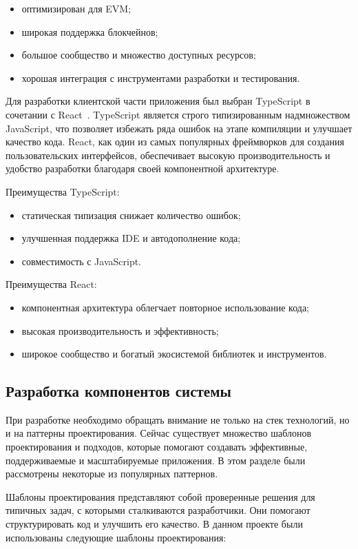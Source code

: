 \begin{itemize}
    \item оптимизирован для EVM;
    \item широкая поддержка блокчейнов;
    \item большое сообщество и множество доступных ресурсов;
    \item хорошая интеграция с инструментами разработки и тестирования.
\end{itemize}

Для разработки клиентской части приложения был выбран TypeScript в сочетании с React~\cite{bib:react}. TypeScript является строго типизированным надмножеством JavaScript, что позволяет избежать ряда ошибок на этапе компиляции и улучшает качество кода. React, как один из самых популярных фреймворков для создания пользовательских интерфейсов, обеспечивает высокую производительность и удобство разработки благодаря своей компонентной архитектуре.

Преимущества TypeScript:
\begin{itemize}
    \item статическая типизация снижает количество ошибок;
    \item улучшенная поддержка IDE и автодополнение кода;
    \item совместимость с JavaScript.
\end{itemize}

Преимущества React:
\begin{itemize}
    \item компонентная архитектура облегчает повторное использование кода;
    \item высокая производительность и эффективность;
    \item широкое сообщество и богатый экосистемой библиотек и инструментов.
\end{itemize}

\subsection{Разработка компонентов системы}

При разработке необходимо обращать внимание не только на стек технологий, но и на паттерны проектирования. Сейчас существует множество шаблонов проектирования и подходов, которые помогают создавать эффективные, поддерживаемые и масштабируемые приложения. В этом разделе были рассмотрены некоторые из популярных паттернов.

Шаблоны проектирования представляют собой проверенные решения для типичных задач, с которыми сталкиваются разработчики. Они помогают структурировать код и улучшить его качество. В данном проекте были использованы следующие шаблоны проектирования:


